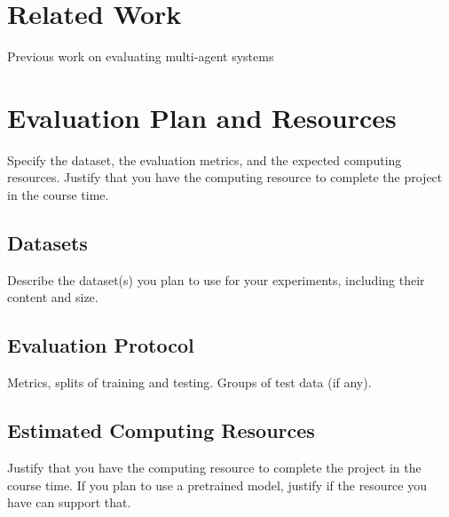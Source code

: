 \documentclass[11pt]{article}
\begin{document}
\section{Related Work}



Previous work on evaluating multi-agent systems \cite{pappu2026multiagent, pmlr-v306-zou26k}

\section{Evaluation Plan and Resources}

Specify the dataset, the evaluation metrics, and the expected computing resources. Justify that you have the computing resource to complete the project in the course time.

\subsection{Datasets}

Describe the dataset(s) you plan to use for your experiments, including their content and size.

\subsection{Evaluation Protocol}

Metrics, splits of training and testing. Groups of test data (if any).

\subsection{Estimated Computing Resources}

Justify that you have the computing resource to complete the project in the course time. If you plan to use a pretrained model, justify if the resource you have can support that.








\end{document}
